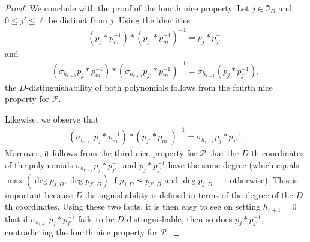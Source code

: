 \documentclass[11pt]{amsart}
\theoremstyle{definition}
\newcommand{\CP}{{\mathcal P}}
\newcommand{\FI}{{\mathfrak I}}
\newcommand{\inv}{^{-1}}
\newcommand{\1}{{\mathbf{1}}}
\begin{document}
\begin{proof}
     We conclude with the proof of the fourth nice property. Let $j\in \FI_D$ and $0\leq j'\leq \ell$ be distinct from $j$. Using the identities
     \begin{align*}
 (p_{j}\ast p_m^{-1})*(p_{j'}\ast p_m^{-1})^{-1}=p_{j}\ast p_{j'}^{-1} %
\end{align*}
and 
\begin{align*}
 (\sigma_{h_{r+1}} p_{j}\ast p_m^{-1})*(\sigma_{h_{r+1}} p_{j'}\ast p_m^{-1})\inv = \sigma_{h_{r+1}} (p_{j}\ast p_{j'}^{-1}),    
\end{align*}
the $D$-distinguishability of both polynomials follows from the fourth nice property for $\CP$. 

Likewise, we observe that 
\begin{align*}
    (\sigma_{h_{r+1}}p_{j}\ast p_m^{-1})*(p_{j'}\ast p_m^{-1})^{-1}=\sigma_{h_{r+1}}p_{j}\ast p_{j'}^{-1}.
\end{align*}
Moreover, it follows from the third nice property for $\CP$ that the $D$-th coordinates of the polynomials $\sigma_{h_{r+1}}p_{j}\ast p_{j'}^{-1}$ and $p_{j}\ast p_{j'}^{-1}$ have the same degree (which equals $\max (\deg p_{j,D}, \deg p_{j',D})$ if $p_{j,D}\not\sim p_{j',D}$ and $\deg p_{j,D}-1$ otherwise). This is important because $D$-distinguishability is defined in terms of the degree of the $D$-th coordinates. Using these two facts, it is then easy to see on setting $h_{r+1}=0$ that if $\sigma_{h_{r+1}}p_{j}\ast p_{j'}^{-1}$ fails to be $D$-distinguishable, then so does $p_{j}\ast p_{j'}^{-1}$,  contradicting the fourth nice property for $\CP$.



\end{proof}
\end{document}
